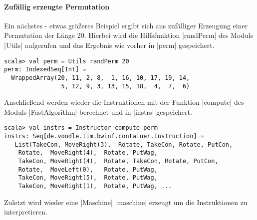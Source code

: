 \paragraph{Zufällig erzeugte Permutation}
Ein nächstes - etwas größeres Beispiel ergibt sich aus zufälliger Erzeugung einer Permutation der Länge 20.
Hierbei wird die Hilfsfunktion |randPerm| des Moduls |Utils| aufgerufen und das Ergebnis wie vorher in |perm| gespeichert.
\begin{lstlisting}
scala> val perm = Utils randPerm 20
perm: IndexedSeq[Int] =
  WrappedArray(20, 11, 2, 8,  1, 16, 10, 17, 19, 14,
                5, 12, 9, 3, 13, 15, 18,  4,  7,  6)
\end{lstlisting}
Anschließend werden wieder die Instruktionen mit der Funktion |compute| des Moduls |FastAlgorithm| berechnet und in |instrs| gespeichert.
\lstset{basicstyle=\ttfamily\small}
\begin{lstlisting}
scala> val instrs = Instructor compute perm
instrs: Seq[de.voodle.tim.bwinf.container.Instruction] =
   List(TakeCon, MoveRight(3),  Rotate, TakeCon, Rotate, PutCon,
	Rotate,  MoveRight(4),  Rotate, PutWag,
	TakeCon, MoveRight(4),  Rotate, TakeCon, Rotate, PutCon,
	Rotate,  MoveLeft(0),   Rotate, PutWag,
	TakeCon, MoveRight(5),  Rotate, PutWag,
	TakeCon, MoveRight(1),  Rotate, PutWag, ...
\end{lstlisting}
Zuletzt wird wieder eine |Maschine| |maschine| erzeugt um die Instruktionen zu interpretieren.
